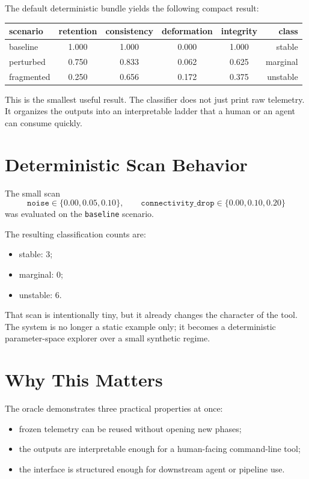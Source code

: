 \documentclass[11pt]{article}
\begin{document}
The default deterministic bundle yields the following compact result:

\begin{center}
\begin{tabular}{lccccr}
\toprule
scenario & retention & consistency & deformation & integrity & class \\
\midrule
baseline   & 1.000 & 1.000 & 0.000 & 1.000 & stable \\
perturbed  & 0.750 & 0.833 & 0.062 & 0.625 & marginal \\
fragmented & 0.250 & 0.656 & 0.172 & 0.375 & unstable \\
\bottomrule
\end{tabular}
\end{center}

This is the smallest useful result. The classifier does not just print raw telemetry. It organizes the outputs into an interpretable ladder that a human or an agent can consume quickly.

\section{Deterministic Scan Behavior}

The small scan
\[
\texttt{noise} \in \{0.00,0.05,0.10\},
\qquad
\texttt{connectivity\_drop} \in \{0.00,0.10,0.20\}
\]
was evaluated on the \texttt{baseline} scenario.

The resulting classification counts are:
\begin{itemize}
\item stable: $3$;
\item marginal: $0$;
\item unstable: $6$.
\end{itemize}

That scan is intentionally tiny, but it already changes the character of the tool. The system is no longer a static example only; it becomes a deterministic parameter-space explorer over a small synthetic regime.

\section{Why This Matters}

The oracle demonstrates three practical properties at once:
\begin{itemize}
\item frozen telemetry can be reused without opening new phases;
\item the outputs are interpretable enough for a human-facing command-line tool;
\item the interface is structured enough for downstream agent or pipeline use.
\end{itemize}
\end{document}
